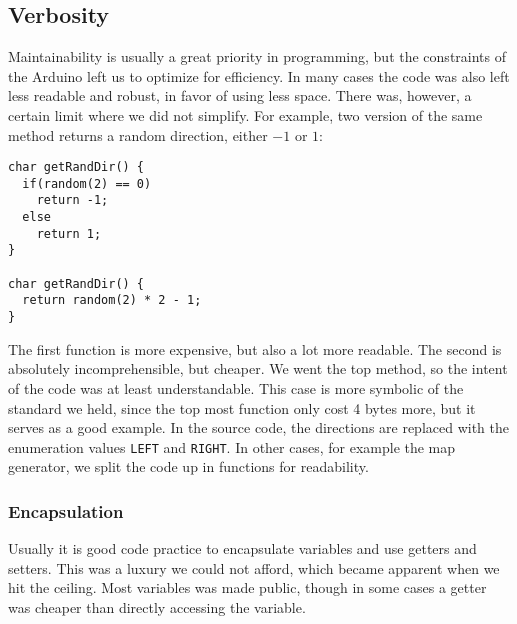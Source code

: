 \subsection{Verbosity} %
Maintainability is usually a great priority in programming, but the constraints of the Arduino left us to optimize for efficiency. In many cases the code was also left less readable and robust, in favor of using less space. There was, however, a certain limit where we did not simplify. For example, two version of the same method returns a random direction, either $-1$ or $1$:
\begin{verbatim}
char getRandDir() {
  if(random(2) == 0)
    return -1;
  else
    return 1;
}

char getRandDir() {
  return random(2) * 2 - 1;
}
\end{verbatim}
The first function is more expensive, but also a lot more readable. The second is absolutely incomprehensible, but cheaper. We went the top method, so the intent of the code was at least understandable. This case is more symbolic of the standard we held, since the top most function only cost 4 bytes more, but it serves as a good example. In the source code, the directions are replaced with the enumeration values {\tt LEFT} and {\tt RIGHT}. In other cases, for example the map generator, we split the code up in functions for readability.

\subsubsection{Encapsulation} %
Usually it is good code practice to encapsulate variables and use getters and setters. This was a luxury we could not afford, which became apparent when we hit the ceiling. Most variables was made public, though in some cases a getter was cheaper than directly accessing the variable.



